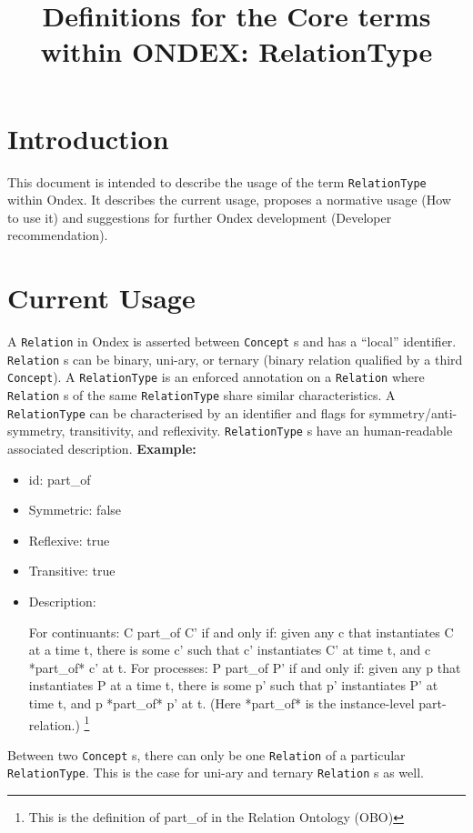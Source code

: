 \documentclass[a4paper,10pt]{article}
\title{Definitions for the Core terms within ONDEX: RelationType}
\newcommand{\example}[1]{\newline\textbf{Example: }#1\xspace}
\newcommand{\term}[1]{\texttt{#1}\xspace}
\newcommand{\rt}{\term{RelationType}}
\newcommand{\re}{\term{Relation}}
\newcommand{\co}{\term{Concept}}
\begin{document}
\maketitle

\section{Introduction}

This document is intended to describe the usage of the term \rt within Ondex. It describes the current usage, proposes a normative usage (How to use it) and suggestions for further Ondex development (Developer recommendation). 

\section{Current Usage}
A \re in Ondex is asserted between \co s and has a ``local'' identifier. \re s can be binary, uni-ary, or ternary (binary relation qualified by a third \co).
\vskip 0.5cm
\noindent
A \rt is an enforced annotation on a \re where \re s of the same \rt share similar characteristics. A \rt can be characterised by an identifier and flags for symmetry/anti-symmetry, transitivity, and reflexivity. \rt s have an human-readable associated description.
\example{}
\begin{itemize}

	\item id: part\_of
	\item Symmetric: false
	\item Reflexive: true
	\item Transitive: true
	\item Description:
	
For continuants: C part\_of C' if and only if: given any c that instantiates C at a time t, there is some c' such that c' instantiates C' at time t, and c *part\_of* c' at t. For processes: P part\_of P' if and only if: given any p that instantiates P at a time t, there is some p' such that p' instantiates P' at time t, and p *part\_of* p' at t. (Here *part\_of* is the instance-level part-relation.)	\footnote{This is the definition of part\_of in the Relation Ontology (OBO)}	



\end{itemize}
Between two \co s, there can only be one \re of a particular \rt. This is the case for uni-ary and ternary \re s as well.
\end{document}
